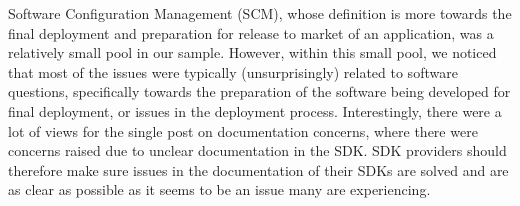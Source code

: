 \documentclass{sigchi}
\begin{document}
\begin{table}[H] %
\centering
\caption{Summary of subcategories and their accompanying demographic information for the Software Configuration Management (SCM) SWEBOK KA}
\label{table:SCMKASummary}
\end{table}
Software Configuration Management (SCM), whose definition is more towards the final deployment and preparation for release to market of an application, was a relatively small pool in our sample. However, within this small pool, we noticed that most of the issues were typically (unsurprisingly) related to software questions, specifically towards the preparation of the software being developed for final deployment, or issues in the deployment process. Interestingly, there were a lot of views for the single post on documentation concerns, where there were concerns raised due to unclear documentation in the SDK. SDK providers should therefore make sure issues in the documentation of their SDKs are solved and are as clear as possible as it seems to be an issue many are experiencing.
\end{document}
